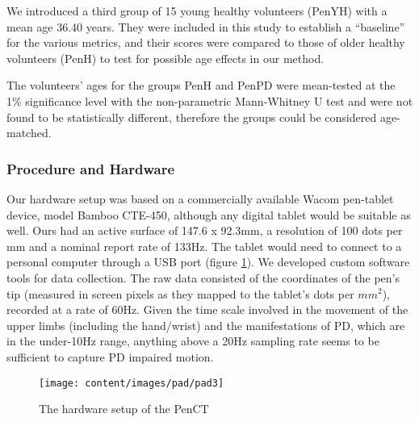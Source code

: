 We introduced a third group of 15 young healthy volunteers (\gls{PenYH}) with a mean age 36.40 years. They were included in this study to establish a ``baseline'' for the various metrics, and their scores were compared to those of older healthy volunteers (\gls{PenH}) to test for possible age effects in our method.

The volunteers' ages for the groups \gls{PenH} and \gls{PenPD} were mean-tested at the 1\% significance level with the non-parametric Mann-Whitney U test and were not found to be statistically different, therefore the groups could be considered age-matched.

\subsubsection{Procedure and Hardware}
\label{subsubsec:PenCTProcHardware} 
Our hardware setup was based on a commercially available Wacom pen-tablet device, model Bamboo CTE-450, although any digital tablet would be suitable as well. Ours had an active surface of 147.6 x 92.3mm, a resolution of 100 dots per mm and a nominal report rate of 133Hz. The tablet would need to connect to a personal computer through a USB port (figure \ref{fig:penCTHW}). We developed custom software tools for data collection. The raw data consisted of the coordinates of the pen's tip (measured in screen pixels as they mapped to the tablet's dots per $mm^{2}$), recorded at a rate of 60Hz. Given the time scale involved in the movement of the upper limbs (including the hand/wrist) and the manifestations of \gls{PD}, which are in the under-10Hz range, anything above a 20Hz sampling rate seems to be sufficient to capture \gls{PD} impaired motion.

\begin{figure}[h]
\centering
  \texttt{[image: content/images/pad/pad3]}
\caption{The hardware setup of the \gls{PenCT}}
\label{fig:penCTHW}
\end{figure}

